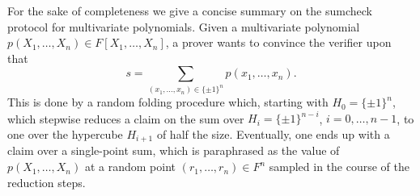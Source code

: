\documentclass[11pt]{article}
\theoremstyle{definition}
\theoremstyle{remark}
\begin{document}
For the sake of completeness we give a concise summary on the sumcheck protocol \cite{sumcheck} for multivariate polynomials.
Given a multivariate polynomial $p(X_1,\ldots, X_n)\in F[X_1,\ldots, X_n]$, a prover wants to convince the verifier upon that
\begin{equation*}
s = \sum_{(x_1,\ldots, x_n) \in \{\pm 1\}^n} p(x_1, \ldots, x_n).
\end{equation*}
This is done by a random folding procedure which, starting with $H_0=\{\pm 1\}^n$, which stepwise reduces a claim on the sum over $H_i = \{\pm 1\}^{n-i}$, $i=0,\ldots, n-1$, to one over the hypercube $H_{i+1}$ of half the size. 
Eventually, one ends up with a claim over a single-point sum, which is paraphrased as the value of $p(X_1,\ldots, X_n)$ at a random point $(r_1,\ldots, r_n)\in F^n$ sampled in the course of the reduction steps.

 
\end{document}
